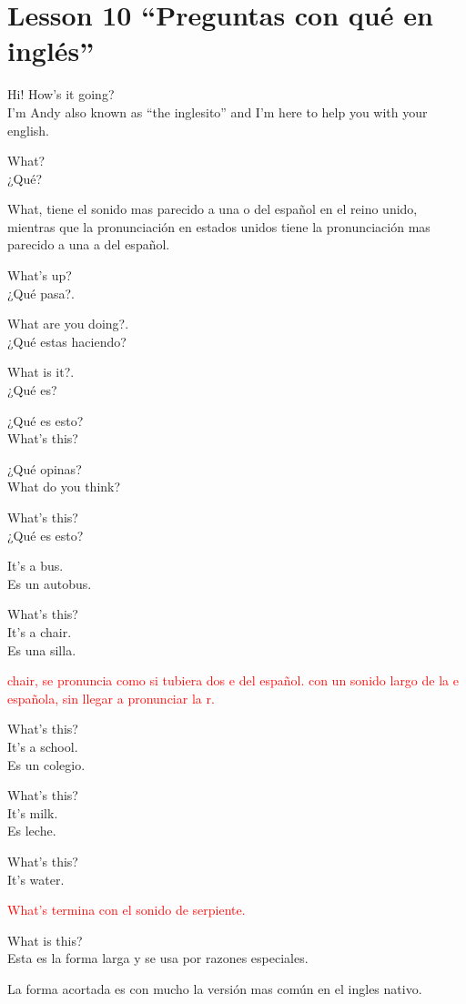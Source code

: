 \section{Lesson 10 ``Preguntas con qué en inglés''}

Hi! How's it going?\\
I'm Andy also known as ``the inglesito'' and I'm here to help you with
your english.

What?\\
¿Qué?

What, tiene el sonido mas parecido a una o del español en el reino unido,
mientras que la pronunciación en estados unidos tiene la pronunciación mas
parecido a una a del español.

What's up?\\
¿Qué pasa?.

What are you doing?.\\
¿Qué estas haciendo?

What is it?.\\
¿Qué es?

¿Qué es esto?\\
What's this?

¿Qué opinas?\\
What do you think?

What's this?\\
¿Qué es esto?

It's a bus.\\
Es un autobus.

What's this?\\
It's a chair.\\
Es una silla.

\textcolor{red}{chair,  se pronuncia como si tubiera dos e del español.
con un sonido largo de la e española, sin llegar a pronunciar la r.}

What's this?\\
It's a school.\\
Es un colegio.

What's this?\\
It's milk.\\
Es leche.

What's this?\\
It's water.

\textcolor{red}{What's termina con el sonido de serpiente.}

What is this?\\
Esta es la forma larga y se usa por razones especiales.

La forma acortada es con mucho la versión mas común en el ingles nativo.

